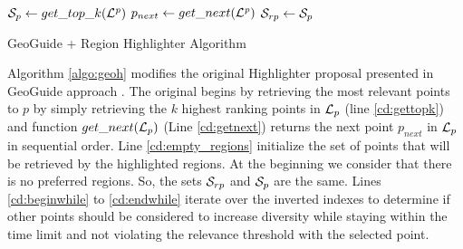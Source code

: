 \documentclass[runningheads,a4paper]{llncs}
\begin{document}


\begin{algorithm}[t]
	\DontPrintSemicolon
	${\cal S}_p \gets get\_top\_k(\mathit{{\cal L}^p})$\;\label{cd:gettopk}
	$p_{next} \gets get\_next(\mathit{{\cal L}^p})$\;\label{cd:getnext}
   ${\cal S}_{rp} \gets {\cal S}_p$\;\label{cd:empty_regions}
	\label{cd:endwhile}
	\; 
	\caption{{\sc GeoGuide} \cite{Omidvar:2017} +  {\sc Region Highlighter} Algorithm}
	\label{algo:geoh}
\end{algorithm}

Algorithm \ref{algo:geoh} modifies the original {\sc Highlighter} proposal presented in GeoGuide \cite{Omidvar:2017} approach .  
The original begins by retrieving the most relevant points to $p$ by simply retrieving the $k$ highest ranking points in ${\cal L}_p$ (line \ref{cd:gettopk}) and function $get\_next({\cal L}_p)$ (Line \ref{cd:getnext}) returns the next point $p_{next}$ in ${\cal L}_p$ in sequential order. Line \ref{cd:empty_regions} initialize the set of points that will be retrieved by the highlighted regions. At the beginning we consider that there is no preferred regions. So, the sets ${\cal S}_{rp}$ and ${\cal S}_{p}$  are the same. Lines \ref{cd:beginwhile} to \ref{cd:endwhile} iterate over the inverted indexes to determine if other points should be considered to increase diversity while staying within the time limit and not violating the relevance threshold with the selected point. %
\end{document}
